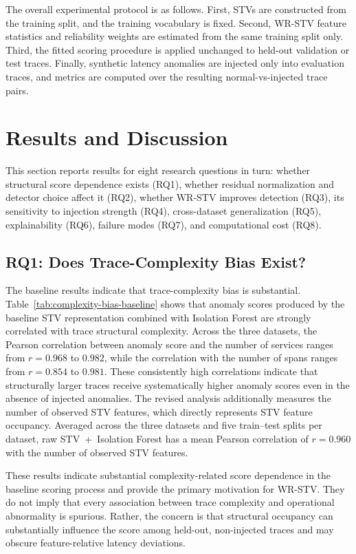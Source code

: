 \documentclass[informatics,article,submit,moreauthors]{Definitions/mdpi}
\newcommand{\rev}[1]{{\color{revisionblue}#1}}
\begin{document}
The overall experimental protocol is as follows. First, STVs are
constructed from the training split, and the training vocabulary is fixed.
Second, WR-STV feature statistics and reliability weights are estimated
from the same training split only. Third, the fitted scoring procedure is
applied unchanged to held-out validation or test traces. Finally,
synthetic latency anomalies are injected only into evaluation traces, and
metrics are computed over the resulting normal-vs-injected trace pairs.

\section{Results and Discussion}
\label{sec:results}

\rev{This section reports results for eight research questions in turn:
whether structural score dependence exists (RQ1), whether residual
normalization and detector choice affect it (RQ2), whether WR-STV
improves detection (RQ3), its sensitivity to injection strength (RQ4),
cross-dataset generalization (RQ5), explainability (RQ6), failure modes
(RQ7), and computational cost (RQ8).}

\subsection{RQ1: Does Trace-Complexity Bias Exist?}

The baseline results indicate that trace-complexity bias is substantial.
Table~\ref{tab:complexity-bias-baseline} shows that anomaly scores
produced by the baseline STV representation combined with Isolation
Forest are strongly correlated with trace structural complexity. Across
the three datasets, the Pearson correlation between anomaly score and
the number of services ranges from \(r=0.968\) to \(0.982\), while the
correlation with the number of spans ranges from \(r=0.854\) to
\(0.981\). These consistently high correlations indicate that
structurally larger traces receive systematically higher anomaly scores
even in the absence of injected anomalies. \rev{The revised analysis
additionally measures the number of observed STV features, which directly
represents STV feature occupancy. Averaged across the three datasets and
five train--test splits per dataset, raw STV~+~Isolation Forest has a mean
Pearson correlation of \(r=0.960\) with the number of observed STV
features.}

\rev{These results indicate substantial complexity-related score dependence
in the baseline scoring process and provide the primary motivation for
WR-STV. They do not imply that every association between trace complexity
and operational abnormality is spurious. Rather, the concern is that
structural occupancy can substantially influence the score among held-out,
non-injected traces and may obscure feature-relative latency deviations.}
\end{document}
